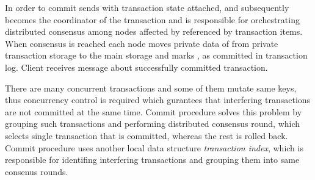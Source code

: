 In order to commit \transaction \client sends \txCommitMessage with transaction state attached, and subsequently  becomes the coordinator of the transaction and is responsible for orchestrating distributed consensus among nodes affected by \transaction referenced by transaction items. When consensus is reached each node moves private data of \transaction from private transaction storage to the main storage and marks \transaction, as committed in transaction log. Client receives message \txCommitResonseMessage about successfully committed transaction.

There are many concurrent transactions and some of them mutate same keys, thus concurrency control is required which gurantees that interfering transactions are not committed at the same time. Commit procedure solves this problem by grouping such transactions and performing distributed consensus round, which selects single transaction that is committed, whereas the rest is rolled back.
Commit procedure uses another local data structure \emph{transaction index}, which is responsible for identifing interfering transactions and grouping them into same consenus rounds.


